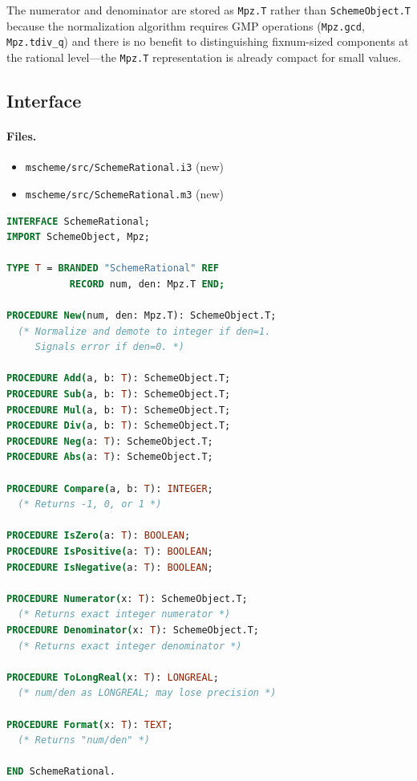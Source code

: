 \documentclass[12pt]{article}
\begin{document}
The numerator and denominator are stored as {\tt Mpz.T} rather
than {\tt SchemeObject.T} because the normalization algorithm
requires GMP operations ({\tt Mpz.gcd}, {\tt Mpz.tdiv\_q}) and
there is no benefit to distinguishing fixnum-sized components
at the rational level---the {\tt Mpz.T} representation is already
compact for small values.

\subsection{Interface}

\paragraph{Files.}
\begin{itemize}[nosep]
\item {\tt mscheme/src/SchemeRational.i3} (new)
\item {\tt mscheme/src/SchemeRational.m3} (new)
\end{itemize}

\begin{lstlisting}[language=Modula3]
INTERFACE SchemeRational;
IMPORT SchemeObject, Mpz;

TYPE T = BRANDED "SchemeRational" REF
           RECORD num, den: Mpz.T END;

PROCEDURE New(num, den: Mpz.T): SchemeObject.T;
  (* Normalize and demote to integer if den=1.
     Signals error if den=0. *)

PROCEDURE Add(a, b: T): SchemeObject.T;
PROCEDURE Sub(a, b: T): SchemeObject.T;
PROCEDURE Mul(a, b: T): SchemeObject.T;
PROCEDURE Div(a, b: T): SchemeObject.T;
PROCEDURE Neg(a: T): SchemeObject.T;
PROCEDURE Abs(a: T): SchemeObject.T;

PROCEDURE Compare(a, b: T): INTEGER;
  (* Returns -1, 0, or 1 *)

PROCEDURE IsZero(a: T): BOOLEAN;
PROCEDURE IsPositive(a: T): BOOLEAN;
PROCEDURE IsNegative(a: T): BOOLEAN;

PROCEDURE Numerator(x: T): SchemeObject.T;
  (* Returns exact integer numerator *)
PROCEDURE Denominator(x: T): SchemeObject.T;
  (* Returns exact integer denominator *)

PROCEDURE ToLongReal(x: T): LONGREAL;
  (* num/den as LONGREAL; may lose precision *)

PROCEDURE Format(x: T): TEXT;
  (* Returns "num/den" *)

END SchemeRational.
\end{lstlisting}
\end{document}
